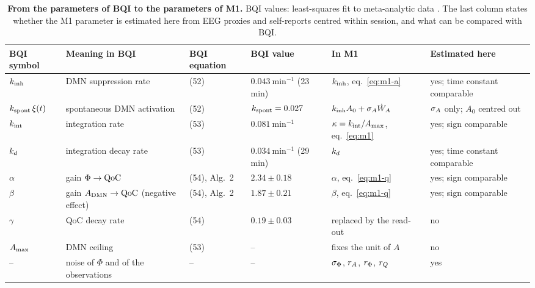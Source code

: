 \begin{table}[t]
\caption{\textbf{From the parameters of BQI to the parameters of M1.} BQI values: least-squares fit to meta-analytic data \cite[Table~5]{BQI}. The last column states whether the M1 parameter is estimated here from EEG proxies and self-reports centred within session, and what can be compared with BQI.}
\label{tab:bqimap}
\centering\footnotesize
\setlength{\tabcolsep}{3pt}
\begin{tabular}{llllll}
\toprule
BQI symbol & Meaning in BQI & BQI equation & BQI value & In M1 & Estimated here \\
\midrule
$k_{\mathrm{inh}}$ & DMN suppression rate & (52) & $0.043~\mathrm{min^{-1}}$ (23 min) & $k_{\mathrm{inh}}$, eq.~\eqref{eq:m1-a} & yes; time constant comparable \\
$k_{\mathrm{spont}}\,\xi(t)$ & spontaneous DMN activation & (52) & $k_{\mathrm{spont}}=0.027$ & $k_{\mathrm{inh}} A_0+\sigma_{A}\dot W_A$ & $\sigma_{A}$ only; $A_0$ centred out \\
$k_{\mathrm{int}}$ & integration rate & (53) & $0.081~\mathrm{min^{-1}}$ & $\kappa=k_{\mathrm{int}}/A_{\max}$, eq.~\eqref{eq:m1} & yes; sign comparable \\
$k_{d}$ & integration decay rate & (53) & $0.034~\mathrm{min^{-1}}$ (29 min) & $k_{d}$ & yes; time constant comparable \\
$\alpha$ & gain $\Phi\to\mathrm{QoC}$ & (54), Alg.~2 & $2.34\pm0.18$ & $\alpha$, eq.~\eqref{eq:m1-q} & yes; sign comparable \\
$\beta$ & gain $A_{\mathrm{DMN}}\to\mathrm{QoC}$ (negative effect) & (54), Alg.~2 & $1.87\pm0.21$ & $\beta$, eq.~\eqref{eq:m1-q} & yes; sign comparable \\
$\gamma$ & QoC decay rate & (54) & $0.19\pm0.03$ & replaced by the read-out & no \\
$A_{\max}$ & DMN ceiling & (53) & -- & fixes the unit of $A$ & no \\
-- & noise of $\Phi$ and of the observations & -- & -- & $\sigma_{\Phi}$, $r_{A}$, $r_{\Phi}$, $r_{Q}$ & yes \\
\bottomrule
\end{tabular}
\end{table}

